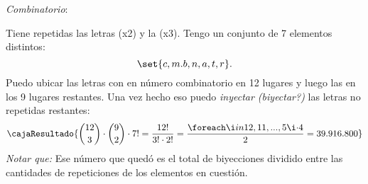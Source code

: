 \bigskip

\textit{Combinatorio}:

Tiene repetidas las letras \textit{} (x2) y la \textit{} (x3).
Tengo un conjunto de 7 elementos distintos:
$$
	\set{c,m.b,n,a,t,r}.
$$
Puedo ubicar las letras con en número combinatorio en 12 lugares \textit{} y luego las
\textit{} en los 9 lugares restantes.
Una vez hecho eso puedo \textit{inyectar (biyectar?)} las letras no repetidas restantes:
$$
	\cajaResultado{
		\binom{12}{3} \cdot \binom{9}{2} \cdot 7! =
		\normalsize \frac{12!}{3! \cdot 2!}
		= \frac{\foreach \i in {12,11,...,5}{\i \cdot}4}{2} = 39.916.800
	}
$$
\textit{Notar que:} Ese número que quedó es el total de biyecciones dividido entre las cantidades
de repeticiones de los elementos en cuestión.

\begin{aportes}
	\item {}
\end{aportes}
